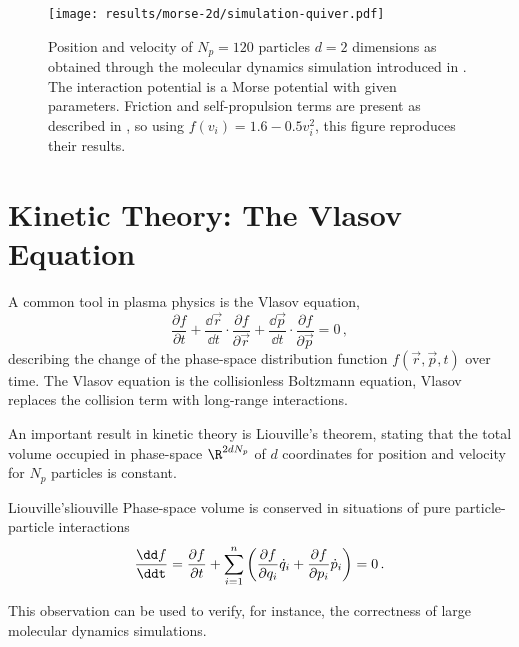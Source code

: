 
\begin{figure}[H]
  \centering
  \texttt{[image: results/morse-2d/simulation-quiver.pdf]}
  \caption[Quiver plot of 120 particles in 2D interacting through the Morse potential]{Position and velocity of $N_p = 120$ particles $d = 2$ dimensions as obtained through the molecular dynamics simulation introduced in . The interaction potential is a Morse potential with given parameters. Friction and self-propulsion terms are present as described in \cite{2006-self-propelled}, so using $f(v_i) = 1.6 - 0.5 v_i^2$, this figure reproduces their results.}
  \label{fig:simulation-quiver-illustration}
\end{figure}


\section{Kinetic Theory: The Vlasov Equation}
A common tool in plasma physics is the Vlasov equation,
$$\frac{\partial f}{\partial t}+{\frac {\dd \vec{r} }{\dd t}}\cdot {\frac {\partial f}{\partial \vec{r} }}+{\frac {\dd \vec{p} }{\dd t}}\cdot {\frac {\partial f}{\partial \vec{p} }}=0\,,$$
describing the change of the phase-space distribution function $f(\vec{r}, \vec{p}, t)$ over time.
The Vlasov equation is the collisionless Boltzmann equation, Vlasov replaces the collision term with long-range interactions.

An important result in kinetic theory is Liouville's theorem, stating that the total volume occupied in phase-space $\R^{2dN_p}$ of $d$ coordinates for position and velocity for $N_p$ particles is constant.

\begin{theorem}{Liouville's}{liouville}
  Phase-space volume is conserved in situations of pure particle-particle interactions
  $$\frac{\dd f}{\ddt}=
    \frac{\partial f}{\partial t}
    +\sum_{i=1}^n\left(\frac{\partial f}{\partial q_i}\dot{q}_i
    +\frac{\partial f}{\partial p_i}\dot{p}_i\right)=0\,.$$
\end{theorem}

This observation can be used to verify, for instance, the correctness of large molecular dynamics simulations.

